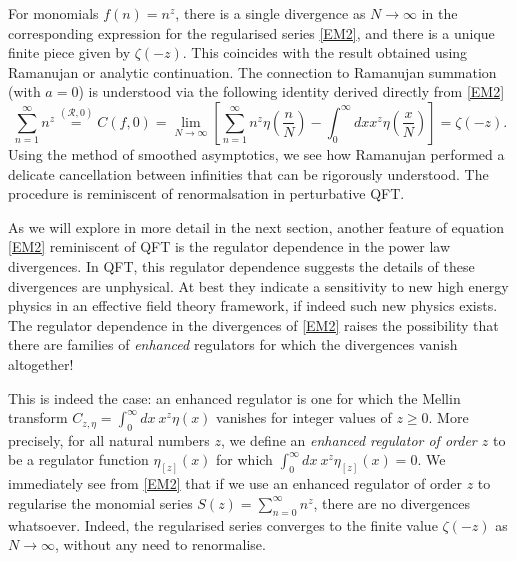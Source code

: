 \documentclass[11pt, letter]{article}
\def\be{\begin{equation}}
\def\ee{\end{equation}}
\newcommand{\Rcal}{\mathcal{R}}
\begin{document}
For monomials $f(n)=n^z$, there is a single divergence as $N\to \infty$ in the corresponding expression for the regularised series \eqref{EM2}, and there is a unique finite piece given by $\zeta(-z)$. This coincides with the result obtained using Ramanujan or analytic continuation.  The connection to Ramanujan summation (with $a=0$) is understood via the following identity derived directly from \eqref{EM2}
\be
\sum_{n=1}^\infty n^z\overset{(\Rcal, 0)}{=}C(f, 0)=\lim_{N \to \infty}\left[\sum_{n=1}^\infty n^z \eta\left(\frac{n}{N}\right)-\int_{0}^\infty dx  x^z \eta\left(\frac{x}{N}\right)\right]=\zeta(-z).
\ee
Using the method of smoothed asymptotics, we see how Ramanujan performed a delicate cancellation between infinities that can be rigorously understood. The procedure is reminiscent of renormalsation in perturbative QFT. 

As we will explore in more detail in the next section, another feature of equation \eqref{EM2} reminiscent of QFT is the regulator dependence in the power law divergences. In QFT, this regulator dependence suggests the details of these divergences are unphysical. At best they indicate a sensitivity to new high energy physics in an effective field theory framework, if indeed such new physics exists. The regulator dependence in the divergences of \eqref{EM2} raises the possibility that there are families of {\it enhanced} regulators for which the divergences vanish altogether!

This is indeed the case: an enhanced regulator is one for which the Mellin transform $C_{z, \eta} =\int_0^\infty dx \  x^z \eta(x)$  vanishes for integer values of $z \geq 0$. More precisely, for all natural numbers $z$, we define an {\it enhanced regulator of order $z$} to be a regulator function $\eta_{[z]}(x)$ for which 
$
\int_0^\infty dx \ x^z \eta_{[z]}(x)=0
$. We immediately see from \eqref{EM2} that if we use an enhanced regulator of order $z$ to  regularise the monomial series $S(z)=\sum_{n=0}^\infty n^z$,  there are no divergences whatsoever. Indeed, the regularised series converges to the finite  value $ \zeta(-z)$ as $N\to \infty$, without any need to renormalise.
\end{document}
